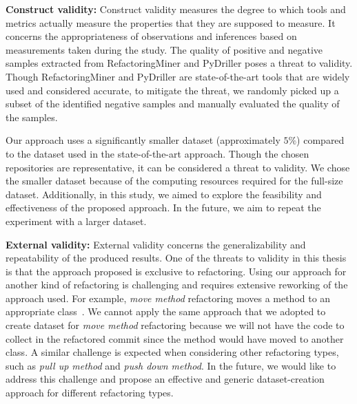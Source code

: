 \noindent
\textbf{Construct validity:} 
Construct validity measures the degree to which tools and metrics actually measure the properties that they are supposed to measure. 
It concerns the appropriateness of observations and inferences based on measurements taken during the study.
The quality of positive and negative samples extracted from RefactoringMiner and PyDriller poses a threat to validity.
Though RefactoringMiner and PyDriller are state-of-the-art tools that are widely used and considered accurate,
to mitigate the threat,
we randomly picked up a subset of the identified negative samples and manually evaluated the quality of the samples.


Our approach uses a significantly smaller dataset (approximately $5\%$) compared to the dataset used in the state-of-the-art approach.
Though the chosen repositories are representative,
it can be considered a threat to validity.
We chose the smaller dataset
because of the computing resources required for the full-size dataset. 
Additionally, in this study, we aimed to explore the feasibility and effectiveness of the proposed approach.
In the future, we aim to repeat the experiment with a larger dataset.

\noindent
\textbf{External validity:}
External validity concerns the generalizability and repeatability of the produced results.
One of the threats to validity in this thesis is that the approach proposed is exclusive to \exm{} refactoring. 
Using our approach for another kind of refactoring is challenging and requires extensive reworking of the approach used. 
For example, \emph{move method} refactoring moves a method to an appropriate class~\cite{Fowler1999Refactoring}. 
We cannot apply the same approach that we adopted to create \exm{} dataset for \emph{move method} refactoring
because we will not have the code to collect in the refactored commit since the method would have moved to another class. 
A similar challenge is expected when considering other refactoring types, such as \emph{pull up method} and \emph{push down method}.
In the future, we would like to address this challenge and propose an effective and generic dataset-creation approach for different refactoring types.
